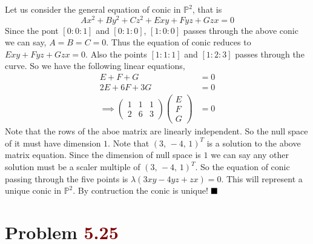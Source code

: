 \documentclass[12pt]{article}
\begin{document}
Let us consider the general equation of conic in $\mathbb{P}^2$, that is $$Ax^2+By^2+Cz^2+Exy+Fyz + G zx =0$$ Since the pont $[0:0:1]$ and $[0:1:0]$, $[1:0:0]$ passes through  the above conic we can say, $A=B=C=0$. Thus the equation of conic reduces to $E xy + Fyz+Gzx=0$. Also the points $[1:1:1]$ and $[1:2:3]$ passes through the curve. So we have the following linear equations, 
\begin{align*}
     E+F+G &=0\\
     2E+6F +3G &=0 \\
     \implies \begin{pmatrix}
        1 & 1 & 1\\
        2 & 6 & 3
     \end{pmatrix} \begin{pmatrix}
        E \\ F \\ G
     \end{pmatrix} & = 0
\end{align*}
Note that the rows of the aboe matrix are linearly independent. So the null space of it must have dimension $1$. Note that $(3, \, -4, \,1)^T$ is a solution to the above matrix equation. Since the dimension of null space is $1$ we can say any other solution must be a scaler multiple of $(3,\, -4, \,1)^T$. So the equation of conic passing through the five  points is $\lambda (3xy -4yz+zx)=0$. This will represent a unique conic in $\mathbb{P}^2$. By contruction the conic is unique! $\hfill \blacksquare$ 

\section*{Problem \textcolor{maroon}{5.25}}
\end{document}
